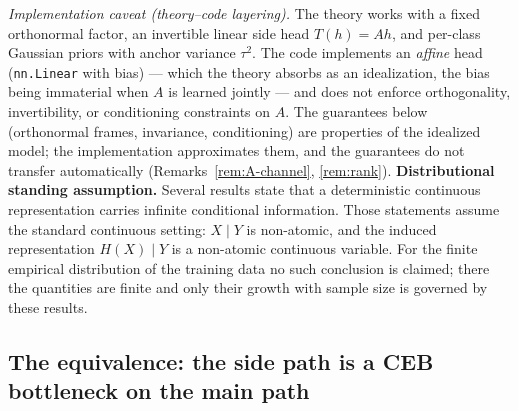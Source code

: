 \emph{Implementation caveat (theory--code layering).} The theory works with a fixed
orthonormal factor, an invertible linear side head $T(h) = Ah$, and per-class Gaussian
priors with anchor variance $\tau^2$. The code implements an \emph{affine} head
(\texttt{nn.Linear} with bias) --- which the theory absorbs as an idealization, the bias
being immaterial when $A$ is learned jointly --- and does not enforce orthogonality,
invertibility, or conditioning constraints on $A$. The guarantees below (orthonormal
frames, invariance, conditioning) are properties of the idealized model; the
implementation approximates them, and the guarantees do not transfer automatically
(Remarks~\ref{rem:A-channel}, \ref{rem:rank}).
\textbf{Distributional standing assumption.} Several results state that a deterministic
continuous representation carries infinite conditional information. Those statements
assume the standard continuous setting: $X \mid Y$ is non-atomic, and the induced
representation $H(X) \mid Y$ is a non-atomic continuous variable. For the finite
empirical distribution of the training data no such conclusion is claimed; there the
quantities are finite and only their growth with sample size is governed by these
results.

\subsection{The equivalence: the side path is a CEB bottleneck on the main path}

